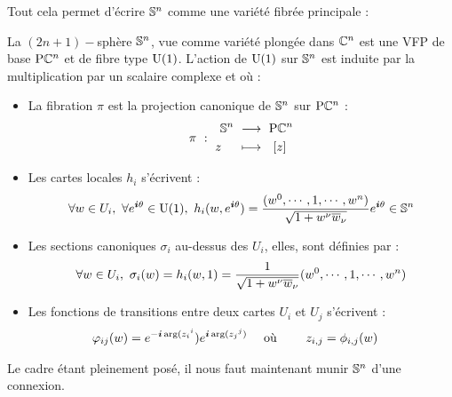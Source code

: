 Tout cela permet d'écrire $\S{n}$ comme une variété fibrée principale :
\begin{proposition}
	La $(2n+1)-$sphère $\S{n}$, vue comme variété plongée dans $\C^n$ est une VFP de base $\PC{n}$ et de fibre type $\U{1}$. L'action de $\U{1}$ sur $\S{n}$ est induite par la multiplication par un scalaire complexe et où :
	\begin{itemize}
		\item La fibration $\pi$ est la projection canonique de $\S{n}$ sur $\PC{n}$ :
		\begin{equation}
			\pi\ :\ \begin{aligned} \S{n}\ &\lr\ \PC{n} \\ z\quad\ &\lmt\ \ [z]\end{aligned}
		\end{equation}
		
		\item Les cartes locales $h_i$ s'écrivent :
		\begin{equation}
			\forall w \in U_i,\ \forall e^{\i \theta}\in\U{1},\  h_i(w,e^{\i \theta}) = \frac{(w^0,\cdots, 1,\cdots, w^n)}{\sqrt{1 + w^\nu \congu{w}_\nu}}e^{\i \theta} \in \S{n}
		\end{equation}
		
		\item Les sections canoniques $\sigma_i$ au-dessus des $U_i$, elles,  sont définies par :
		\begin{equation}
			\forall w \in U_i,\ \sigma_i(w) = h_i(w, 1) = \frac{1}{\sqrt{1 + w^\nu \congu{w}_\nu}}(w^0,\cdots, 1,\cdots, w^n)
		\end{equation}
		
		\item Les fonctions de transitions entre deux cartes $U_i$ et $U_j$ s'écrivent :
		\begin{align}
			\varphi_{ij}(w) &= e^{-\i  \arg ({z_i}^i}) e^{\i  \arg ({z_j}^j)}  &  \text{ où }&\qquad z_{i,j} = \phi_{i,j}(w)
	\end{align}
\end{itemize}
\end{proposition}
\skipl

Le cadre étant pleinement posé, il nous faut maintenant munir $\S{n}$ d'une connexion.




